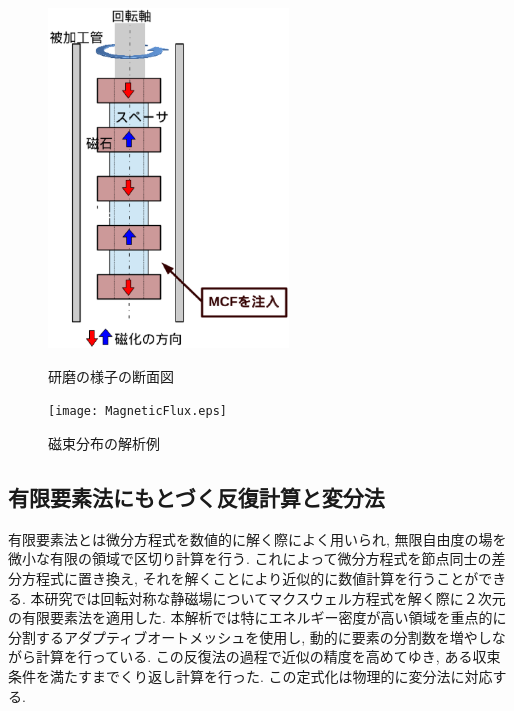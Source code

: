 \documentclass[11pt]{jarticle}
\begin{document}
  \begin{figure}[H]
    \begin{minipage}{0.5\hsize}
      \begin{center}
        \includegraphics[height=90mm]{sd.eps}
      \end{center}
      \caption{研磨の様子の断面図}
      \label{fig:sd}
    \end{minipage}
    \begin{minipage}{0.5\hsize}
      \begin{center}
        \texttt{[image: MagneticFlux.eps]}
      \end{center}
      \caption{磁束分布の解析例}
      \label{fig:MagneticFlux}
    \end{minipage}
  \end{figure}

  \subsection{有限要素法にもとづく反復計算と変分法}
有限要素法とは微分方程式を数値的に解く際によく用いられ, 無限自由度の場を微小な有限の領域で区切り計算を行う. これによって微分方程式を節点同士の差分方程式に置き換え, それを解くことにより近似的に数値計算を行うことができる. 本研究では回転対称な静磁場についてマクスウェル方程式を解く際に２次元の有限要素法を適用した. 本解析では特にエネルギー密度が高い領域を重点的に分割するアダプティブオートメッシュを使用し, 動的に要素の分割数を増やしながら計算を行っている. この反復法の過程で近似の精度を高めてゆき, ある収束条件を満たすまでくり返し計算を行った. この定式化は物理的に変分法に対応する. 
\newpage
\end{document}

